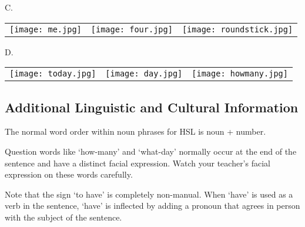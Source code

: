 \documentclass{tufte-book}
\begin{document}
\begin{enumerate}
\begin{description}
\begin{table*}[h!]
\begin{tabular}{c c c}
\end{tabular}
\end{table*}

\item{C.}
\begin{table*}[h!]
\begin{tabular}{c c c}
\texttt{[image: me.jpg]} & \texttt{[image: four.jpg]} & \texttt{[image: roundstick.jpg]} \\

\end{tabular}
\end{table*}
\newpage
\item{D.}
\begin{table*}[h!]
\begin{tabular}{c c c}
\texttt{[image: today.jpg]} & \texttt{[image: day.jpg]} & \texttt{[image: howmany.jpg]} \\

\end{tabular}
\end{table*}

\end{description}

\end{enumerate}

\vspace{2cm}
\subsection{Additional Linguistic and Cultural Information}

The normal word order within noun phrases for HSL is noun + number.

Question words like `how-many' and `what-day' normally occur at the end of the sentence and have a distinct facial expression. Watch your teacher’s facial expression on these words carefully.

Note that the sign `to have' is completely non-manual. When `have' is used as a verb in the sentence, `have' is inflected by adding a pronoun that agrees in person with the subject of the sentence.
\end{document}
